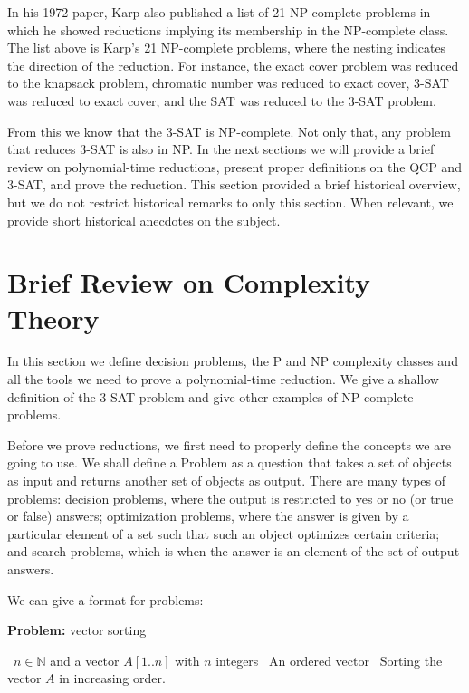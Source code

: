 \documentclass{amsart}
\theoremstyle{plain}
\begin{document}
In his 1972 paper, Karp also published a list of 21 NP-complete problems in which he showed
reductions implying its membership in the NP-complete class. The list above is Karp's 21
NP-complete problems, where the nesting indicates the direction of the reduction. For instance, the
exact cover problem was reduced to the knapsack problem, chromatic number was reduced to exact
cover, 3-SAT was reduced to exact cover, and the SAT was reduced to the 3-SAT problem.

From this we know that the 3-SAT is NP-complete. Not only that, any problem that reduces 3-SAT is
also in NP\@. In the next sections we will provide a brief review on polynomial-time reductions,
present proper definitions on the QCP and 3-SAT, and prove the reduction. This section provided a
brief historical overview, but we do not restrict historical remarks to only this section. When
relevant, we provide short historical anecdotes on the subject.

\section{Brief Review on Complexity Theory}

In this section we define decision problems, the P and NP complexity classes and all the tools we
need to prove a polynomial-time reduction. We give a shallow definition of the 3-SAT problem and
give other examples of NP-complete problems.

Before we prove reductions, we first need to properly define the concepts we are going to use. We
shall define a Problem as a question that takes a set of objects as input and returns another set
of objects as output. There are many types of problems: decision problems, where the output is
restricted to yes or no (or true or false) answers; optimization problems, where the answer is
given by a particular element of a set such that such an object optimizes certain criteria; and
search problems, which is when the answer is an element of the set of output answers.

We can give a format for problems:

\begin{algorithm}[h]
  \caption*{\textbf{Problem:} vector sorting}
  \begin{algorithmic}[1]
    \Require\, $n\in\mathbb{N}$ and a vector $A[1..n]$ with $n$ integers
    \Ensure\, An ordered vector
    \Statex\, Sorting the vector $A$ in increasing order.
  \end{algorithmic}
\end{algorithm}
\end{document}
